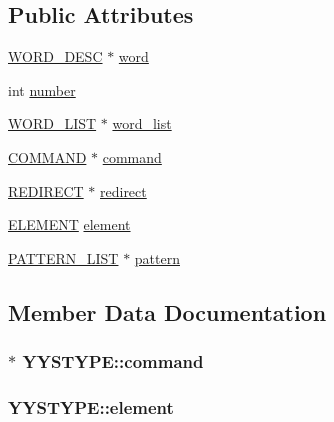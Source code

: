 \subsection*{Public Attributes}
\begin{DoxyCompactItemize}
\item 
\hyperlink{command_8h_a3f0cccf333703e5f6c4168be0db675fa}{W\+O\+R\+D\+\_\+\+D\+E\+SC} $\ast$ \hyperlink{unionYYSTYPE_a8cc77cd40d569fa92c917c3e11a5e4bb}{word}
\item 
int \hyperlink{unionYYSTYPE_a240bd0051381dcdbd03b9c3764570b93}{number}
\item 
\hyperlink{command_8h_ac42a7b781459884316a1f2ffe79e8a62}{W\+O\+R\+D\+\_\+\+L\+I\+ST} $\ast$ \hyperlink{unionYYSTYPE_aaa247cc53b81b682e2a02cb246fa2e5f}{word\+\_\+list}
\item 
\hyperlink{command_8h_a8c41dec142c299806885773c902c0d87}{C\+O\+M\+M\+A\+ND} $\ast$ \hyperlink{unionYYSTYPE_a79c2ad9baf29ad6f85731c1f27372b8b}{command}
\item 
\hyperlink{command_8h_adeb9f5d937c92c7923aec48ad5e47d57}{R\+E\+D\+I\+R\+E\+CT} $\ast$ \hyperlink{unionYYSTYPE_aa0010a419e6ecb1a506d7ff004462712}{redirect}
\item 
\hyperlink{command_8h_ad98861155f12e470f2a392b7767cbe23}{E\+L\+E\+M\+E\+NT} \hyperlink{unionYYSTYPE_a84a38406ac394e9c45c3d333d1015deb}{element}
\item 
\hyperlink{command_8h_a05098e88133e048a1acf396288758a9e}{P\+A\+T\+T\+E\+R\+N\+\_\+\+L\+I\+ST} $\ast$ \hyperlink{unionYYSTYPE_abf7ad756ffb663853f56047bcfed8a55}{pattern}
\end{DoxyCompactItemize}


\subsection{Member Data Documentation}
\subsubsection[{\texorpdfstring{command}{command}}]{ $\ast$ Y\+Y\+S\+T\+Y\+P\+E\+::command}\hypertarget{unionYYSTYPE_a79c2ad9baf29ad6f85731c1f27372b8b}{}\label{unionYYSTYPE_a79c2ad9baf29ad6f85731c1f27372b8b}
\subsubsection[{\texorpdfstring{element}{element}}]{ Y\+Y\+S\+T\+Y\+P\+E\+::element}\hypertarget{unionYYSTYPE_a84a38406ac394e9c45c3d333d1015deb}{}\label{unionYYSTYPE_a84a38406ac394e9c45c3d333d1015deb}

